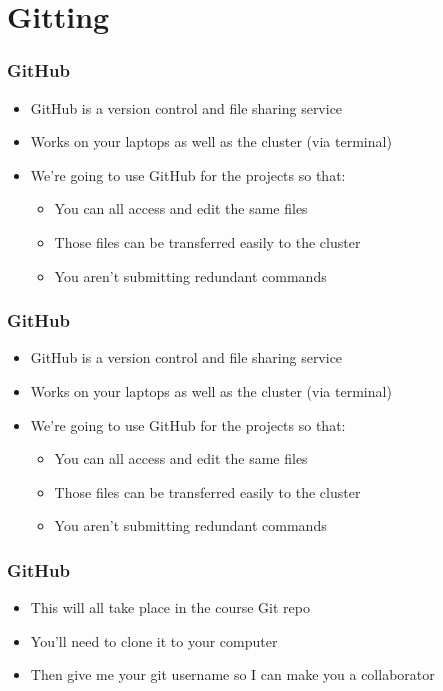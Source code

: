 \documentclass[14pt]{beamer}
\begin{document}
\section{Gitting}

\begin{frame}
\frametitle{GitHub}
\begin{itemize}
	\item<+-> GitHub is a version control and file sharing service
	\item<+-> Works on your laptops as well as the cluster (via terminal)
	\item<+-> We're going to use GitHub for the projects so that:
	\begin{itemize}
		\item<+-> You can all access and edit the same files
		\item<+-> Those files can be transferred easily to the cluster
		\item<+-> You aren't submitting redundant commands
	\end{itemize}
\end{itemize}
\end{frame}

\begin{frame}
\frametitle{GitHub}
\begin{itemize}
	\item<+-> GitHub is a version control and file sharing service
	\item<+-> Works on your laptops as well as the cluster (via terminal)
	\item<+-> We're going to use GitHub for the projects so that:
	\begin{itemize}
		\item<+-> You can all access and edit the same files
		\item<+-> Those files can be transferred easily to the cluster
		\item<+-> You aren't submitting redundant commands
	\end{itemize}
\end{itemize}
\end{frame}

\begin{frame}
\frametitle{GitHub}
\begin{itemize}
	\item<+-> This will all take place in the course Git repo
	\item<+-> You'll need to clone it to your computer
	\item<+-> Then give me your git username so I can make you a collaborator
\end{itemize}
\end{frame}
\end{document}
